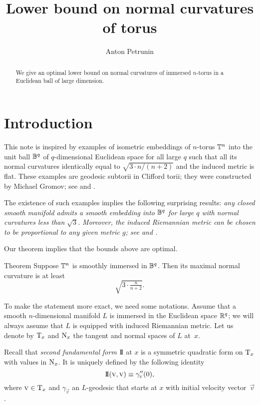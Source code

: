 \documentclass[a4paper,10pt]{article}
\begin{document}


\title{Lower bound on normal curvatures of torus}
\author{Anton Petrunin}
\date{}
\maketitle

\begin{abstract}
We give an optimal lower bound on normal curvatures of immersed $n$-torus in a Euclidean ball of large dimension. 
\end{abstract}

\section{Introduction}

This note is inspired by examples of isometric embeddings of $n$-torus $\mathbb{T}^n$ into the unit ball $\mathbb{B}^q$ of $q$-dimensional Euclidean space for all large $q$ such that all its normal curvatures identically equal to $\sqrt{3\cdot n/(n+2)}$ and the induced metric is flat.
These examples are geodesic subtorii in  Clifford torii;
they were constructed by Michael Gromov; see \cite[2.A]{gromov3} and \cite[1.1.A.]{gromov2}. 

The existence of such examples implies the following surprising results:
\textit{any closed smooth manifold admits a smooth embedding into $\mathbb{B}^q$ for large $q$ with normal curvatures less than $\sqrt{3}$.}
\textit{Moreover, the induced Riemannian metric can be chosen to be proportional to any given metric $g$;
see \cite[1.D]{gromov3} and \cite[1.1.C]{gromov2}.}

Our theorem implies that the bounds above are optimal.

\begin{thm}{Theorem}
\label{thm:main}
Suppose $\mathbb{T}^n$ is smoothly immersed in $\mathbb{B}^q$.
Then its maximal normal curvature is at least 
\[\sqrt{3\cdot \tfrac{n}{n+2}}.\]
\end{thm}

To make the statement more exact, we need some notations.
Assume that a smooth $n$-dimensional manifold $L$ is immersed in the Euclidean space $\mathbb{R}^q$;
we will always assume that $L$ is equipped with induced Riemannian metric.
Let us denote by $\mathrm{T}_x$ and $\mathrm{N}_x$ the tangent and normal spaces of $L$ at~$x$.

Recall that \emph{second fundamental form} $\mathrm{I}\!\mathrm{I}$ at $x$ is a symmetric quadratic form on $\mathrm{T}_x$ with values in $\mathrm{N}_x$.
It is uniquely defined by the following identity
\[\mathrm{I}\!\mathrm{I}(\text{\sc{v}},\text{\sc{v}})\equiv \gamma''_{\text{\sc{v}}}(0),\]
where $\text{\sc{v}}\in \mathrm{T}_x$ and $\gamma_{\vec v}$ an $L$-geodesic that starts at $x$ with initial velocity vector~$\vec v$.
\end{document}
